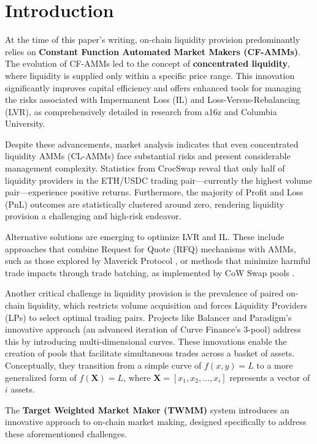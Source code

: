 \section{Introduction}

At the time of this paper's writing, on-chain liquidity provision predominantly relies on \textbf{Constant Function Automated Market Makers (CF-AMMs)}. The evolution of CF-AMMs led to the concept of \textbf{concentrated liquidity}, where liquidity is supplied only within a specific price range. This innovation significantly improves capital efficiency and offers enhanced tools for managing the risks associated with Impermanent Loss (IL) and Loss-Versus-Rebalancing (LVR), as comprehensively detailed in research from a16z and Columbia University\cite{AMMandLVR}. 

Despite these advancements, market analysis indicates that even concentrated liquidity AMMs (CL-AMMs) face substantial risks and present considerable management complexity. Statistics from CrocSwap \cite{CrocSwap2023} reveal that only half of liquidity providers in the ETH/USDC trading pair—currently the highest volume pair—experience positive returns. Furthermore, the majority of Profit and Loss (PnL) outcomes are statistically clustered around zero, rendering liquidity provision a challenging and high-risk endeavor.

Alternative solutions are emerging to optimize LVR and IL. These include approaches that combine Request for Quote (RFQ) mechanisms with AMMs, such as those explored by Maverick Protocol \cite{MaverickAMM2023}, or methods that minimize harmful trade impacts through trade batching, as implemented by CoW Swap pools \cite{Cowswap2025}.

Another critical challenge in liquidity provision is the prevalence of paired on-chain liquidity, which restricts volume acquisition and forces Liquidity Providers (LPs) to select optimal trading pairs. Projects like Balancer \cite{Balancer2019} and Paradigm's innovative approach \cite{Orbital2025} (an advanced iteration of Curve Finance's 3-pool) address this by introducing multi-dimensional curves. These innovations enable the creation of pools that facilitate simultaneous trades across a basket of assets. Conceptually, they transition from a simple curve of $f(x,y) = L$ to a more generalized form of $f(\mathbf{X}) = L$, where $\mathbf{X} = [x_1, x_2, \dots, x_i]$ represents a vector of $i$ assets.

The \textbf{Target Weighted Market Maker (TWMM)} system introduces an innovative approach to on-chain market making, designed specifically to address these aforementioned challenges.